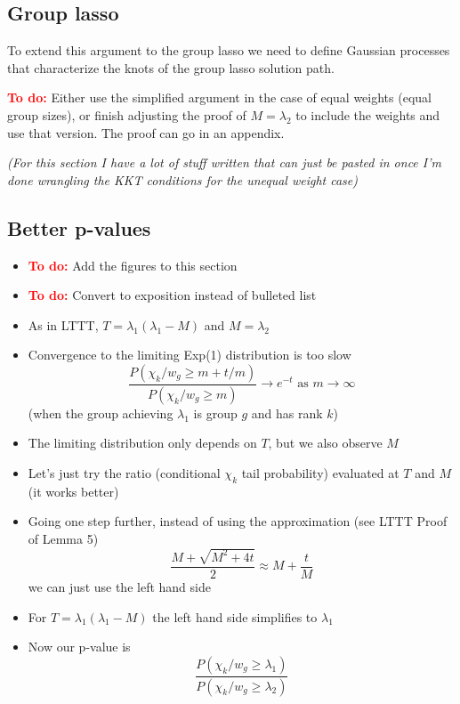 \documentclass{imsart}
\newcommand{\todo}{\textcolor{red}{\textbf{To do: }}}
\begin{document}
\subsection{Group lasso}
To extend this argument to the group lasso we need to define Gaussian
processes that characterize the knots of the group lasso solution
path.  

\todo Either use the simplified argument in the case of equal weights
(equal group sizes), or finish adjusting the proof of $M = \lambda_2$
to include the weights and use that version. The proof can go in an
appendix. 

\emph{(For this section I have a lot of stuff written that can just be pasted in once I'm done wrangling the KKT conditions for the unequal weight case)}

\subsection{Better p-values}



\begin{itemize}

\item \todo Add the figures to this section
\item \todo Convert to exposition instead of bulleted list
  \item As in LTTT, $T = \lambda_1 (\lambda_1 - M)$ and $M = \lambda_2$
  \item Convergence to the limiting Exp(1) distribution is too slow
    \[
      \frac{P(\chi_k / w_g \geq m + t/m)}{P(\chi_k / w_g \geq m)} \to e^{-t} \text{ as } m \to \infty
    \]
    (when the group achieving $\lambda_1$ is group $g$ and has rank $k$)
  \item The limiting distribution only depends on $T$, but we also observe $M$
  \item Let's just try the ratio (conditional $\chi_k$ tail probability) evaluated at $T$ and $M$ (it works better)
  \item Going one step further, instead of using the approximation (see LTTT Proof of Lemma 5)
    \[
      \frac{M + \sqrt{M^2+4t}}{2} \approx M + \frac{t}{M}
    \]
    we can just use the left hand side
  \item For $T = \lambda_1(\lambda_1 - M)$ the left hand side simplifies to $\lambda_1$
  \item Now our p-value is
    \[
      \frac{P(\chi_k / w_g \geq \lambda_1)}{P(\chi_k / w_g \geq \lambda_2)}
    \]   
\end{itemize}
\end{document}
